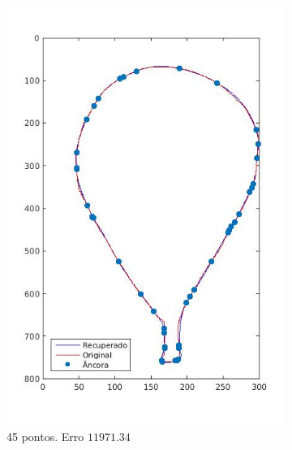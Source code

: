 \begin{figure}[ht!]
	\centering
	\caption{Representação da curva do contorno da folha, utilizando pontos de maior curvatura como amostra.}
	\begin{subfigure}[t]{0.31\textwidth}
		\centering
		\includegraphics[width=\textwidth]{img/curv45.jpg}
		\caption{45 pontos. Erro $11971.34$}
		\label{fig:ex31}
	\end{subfigure}
	\hfill
	\begin{subfigure}[t]{0.31\textwidth}
		\centering

\end{subfigure}
\end{figure}
